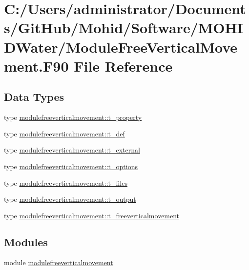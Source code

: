 \hypertarget{_module_free_vertical_movement_8_f90}{}\section{C\+:/\+Users/administrator/\+Documents/\+Git\+Hub/\+Mohid/\+Software/\+M\+O\+H\+I\+D\+Water/\+Module\+Free\+Vertical\+Movement.F90 File Reference}
\label{_module_free_vertical_movement_8_f90}
\subsection*{Data Types}
\begin{DoxyCompactItemize}
\item 
type \mbox{\hyperlink{structmodulefreeverticalmovement_1_1t__property}{modulefreeverticalmovement\+::t\+\_\+property}}
\item 
type \mbox{\hyperlink{structmodulefreeverticalmovement_1_1t__def}{modulefreeverticalmovement\+::t\+\_\+def}}
\item 
type \mbox{\hyperlink{structmodulefreeverticalmovement_1_1t__external}{modulefreeverticalmovement\+::t\+\_\+external}}
\item 
type \mbox{\hyperlink{structmodulefreeverticalmovement_1_1t__options}{modulefreeverticalmovement\+::t\+\_\+options}}
\item 
type \mbox{\hyperlink{structmodulefreeverticalmovement_1_1t__files}{modulefreeverticalmovement\+::t\+\_\+files}}
\item 
type \mbox{\hyperlink{structmodulefreeverticalmovement_1_1t__output}{modulefreeverticalmovement\+::t\+\_\+output}}
\item 
type \mbox{\hyperlink{structmodulefreeverticalmovement_1_1t__freeverticalmovement}{modulefreeverticalmovement\+::t\+\_\+freeverticalmovement}}
\end{DoxyCompactItemize}
\subsection*{Modules}
\begin{DoxyCompactItemize}
\item 
module \mbox{\hyperlink{namespacemodulefreeverticalmovement}{modulefreeverticalmovement}}
\end{DoxyCompactItemize}
